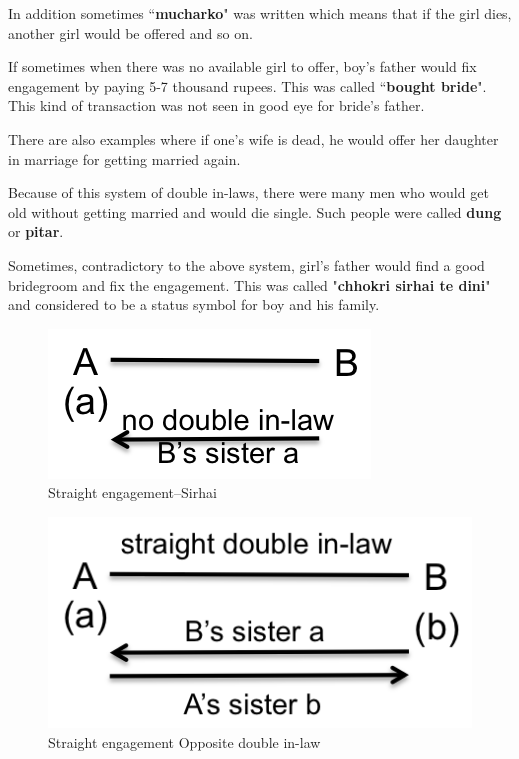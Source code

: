 In addition sometimes ``\textbf{mucharko}" was written which means that if the
girl dies, another girl would be offered and so on.

If sometimes when there was no available girl to offer, boy's father would fix
engagement by paying 5-7 thousand rupees. This was called ``\textbf{bought
bride}". This kind of transaction was not seen in good eye for bride's father.

There are also examples where if one's wife is dead, he would offer her
daughter in marriage for getting married again. 

Because of this system of double in-laws, there were many men who would get old
without getting married and would die single. Such people were called
\textbf{dung} or \textbf{pitar}.

Sometimes, contradictory to the above system, girl's father would find a good
bridegroom and fix the engagement. This was called "\textbf{chhokri sirhai te dini}"
and considered to be a status symbol for boy and his family.

\begin{figure}
\center
\includegraphics{figures/engagement/straight-sirhai}
\caption{Straight engagement--Sirhai
\label{figure:engage_1}}
\end{figure}

\begin{figure}
\center
\includegraphics{figures/engagement/straight_opposite_2}
\caption{ Straight engagement Opposite double in-law
\label{figure:engage_2}}
\end{figure}

